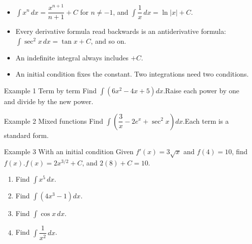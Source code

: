\documentclass[11pt]{article}
\begin{document}

\begin{ideabox}
\begin{itemize}[leftmargin=*,itemsep=2pt,topsep=2pt]
  \item $\displaystyle\int x^n\,dx=\dfrac{x^{n+1}}{n+1}+C$ for $n\neq-1$, and $\displaystyle\int\dfrac1x\,dx=\ln|x|+C$.
  \item Every derivative formula read backwards is an antiderivative formula: $\displaystyle\int\sec^2x\,dx=\tan x+C$, and so on.
  \item An indefinite integral always includes $+C$.
  \item An initial condition fixes the constant. Two integrations need two conditions.
\end{itemize}
\end{ideabox}

\begin{example}{Example 1 \textperiodcentered{} Term by term}
Find $\displaystyle\int\left(6x^2-4x+5\right)dx$.\soln Raise each power by one and divide by the new power.
\end{example}

\begin{example}{Example 2 \textperiodcentered{} Mixed functions}
Find $\displaystyle\int\left(\dfrac3x-2e^{x}+\sec^2x\right)dx$.\soln Each term is a standard form.
\end{example}

\begin{example}{Example 3 \textperiodcentered{} With an initial condition}
Given $f'(x)=3\sqrt{x}$ and $f(4)=10$, find $f(x)$.\soln $f(x)=2x^{3/2}+C$, and $2(8)+C=10$.
\end{example}

\newpage
{}

\begin{enumerate}[leftmargin=*,itemsep=2pt]
  \item Find $\displaystyle\int x^5\,dx$.\work{2.3cm}
  \item Find $\displaystyle\int\left(4x^3-1\right)dx$.\work{2.3cm}
  \item Find $\displaystyle\int\cos x\,dx$.\work{2.3cm}
  \item Find $\displaystyle\int\dfrac{1}{x^2}\,dx$.\work{2.3cm}
\end{enumerate}
\end{document}
